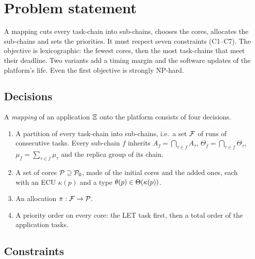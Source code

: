 \section{Problem statement}
\label{sec:problem}

\begin{inbrief}
A mapping cuts every task-chain into sub-chains, chooses the cores,
allocates the sub-chains and sets the priorities. It must respect seven
constraints (C1--C7). The objective is lexicographic: the fewest cores,
then the most task-chains that meet their deadline. Two variants add a
timing margin and the software updates of the platform's life. Even the
first objective is strongly NP-hard.
\end{inbrief}

\subsection{Decisions}

A \emph{mapping} of an application $\Xi$ onto the platform consists of
four decisions.
\begin{enumerate}[label=(D\arabic*)]
\item A partition of every task-chain into sub-chains, i.e.\ a set $\mathcal{F}$
of runs of consecutive tasks. Every sub-chain $f$ inherits $A_f=
\bigcap_{\tau\in f}A_\tau$, $\Theta_f=\bigcap_{\tau\in f}\Theta_\tau$,
$\mu_f=\sum_{\tau\in f}\mu_\tau$ and the replica group of its chain.
\item A set of cores $\mathcal{P}\supseteq\mathcal{P}_0$, made of the initial cores
and the added ones, each with an ECU $\kappa(p)$ and a type
$\theta(p)\in\Theta(\kappa(p))$.
\item An allocation $\pi:\mathcal{F}\to\mathcal{P}$.
\item A priority order on every core: the LET task first, then a total
order of the application tasks.
\end{enumerate}

\subsection{Constraints}

